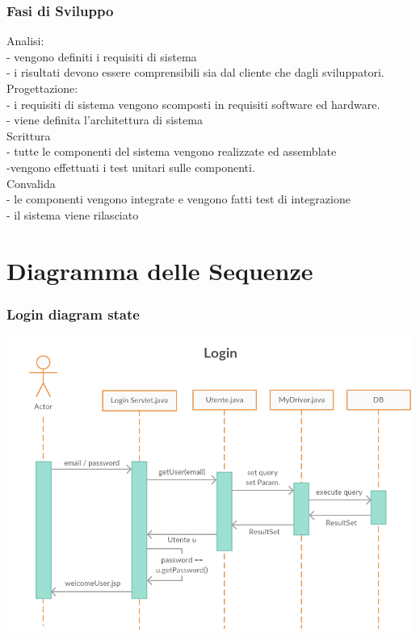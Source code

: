 \documentclass[a4paper,12pt]{beamer}
\begin{document}
\begin{frame}
\frametitle{Fasi di Sviluppo}
Analisi:\\
- vengono definiti i requisiti di sistema\\
- i risultati devono essere comprensibili sia dal cliente che dagli sviluppatori.\\
Progettazione:\\
- i requisiti di sistema vengono scomposti in requisiti software ed hardware.\\
- viene definita l’architettura di sistema\\
Scrittura \\
- tutte le componenti del sistema vengono realizzate ed assemblate  \\
-vengono effettuati i test unitari sulle componenti.\\
Convalida\\
- le componenti vengono integrate e vengono fatti test di integrazione\\
- il sistema viene rilasciato\\
\end{frame}

\pagebreak

\section{Diagramma delle Sequenze}
\begin{frame}
\frametitle{Login diagram state}
\includegraphics[scale=0.4]{LoginSeq.png}
\end{frame}
\end{document}
